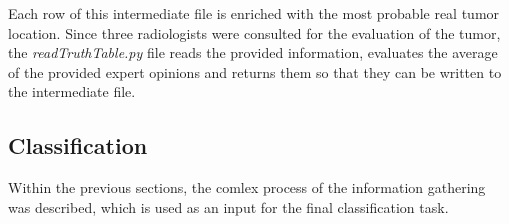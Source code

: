 \documentclass[twoside,11pt]{article}
\begin{document}
	Each row of this intermediate file is enriched with the most probable real tumor location. Since three radiologists were consulted for the evaluation of the tumor, the \textit{readTruthTable.py} file reads the provided information, evaluates the average of the provided expert opinions and returns them so that they can be written to the intermediate file.
	
\subsection{Classification}
	Within the previous sections, the comlex process of the information gathering was described, which is used as an input for the final classification task.
	

\end{document}
